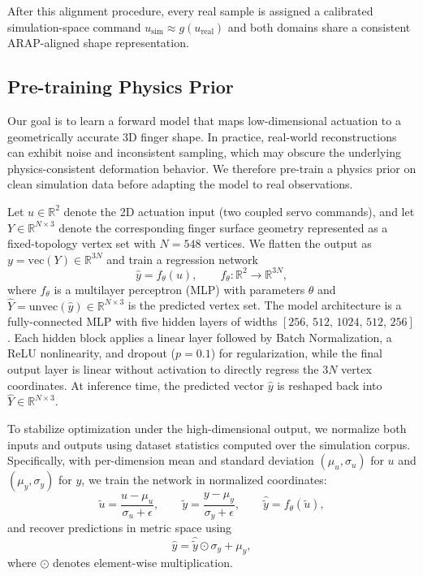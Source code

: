 \documentclass[letterpaper, 10 pt, conference]{ieeeconf}  %
\begin{document}
After this alignment procedure, every real sample is assigned a calibrated simulation-space command $u_{\text{sim}} \approx g(u_{\text{real}})$ and both domains share a consistent ARAP-aligned shape representation.

\subsection{Pre-training Physics Prior}
\label{sec:sim_pretrain}

Our goal is to learn a forward model that maps low-dimensional actuation to a geometrically accurate 3D finger shape. In practice, real-world reconstructions can exhibit noise and inconsistent sampling, which may obscure the underlying physics-consistent deformation behavior. We therefore pre-train a physics prior on clean simulation data before adapting the model to real observations.

Let $u \in \mathbb{R}^2$ denote the 2D actuation input (two coupled servo commands), and let $Y \in \mathbb{R}^{N\times 3}$ denote the corresponding finger surface geometry represented as a fixed-topology vertex set with $N=548$ vertices. We flatten the output as $y=\mathrm{vec}(Y)\in\mathbb{R}^{3N}$ and train a regression network
\begin{equation}
\hat{y} = f_{\theta}(u), \qquad f_{\theta}:\mathbb{R}^{2}\rightarrow\mathbb{R}^{3N},
\label{eq:forward_model}
\end{equation}
where $f_{\theta}$ is a multilayer perceptron (MLP) with parameters $\theta$ and $\hat{Y}=\mathrm{unvec}(\hat{y})\in\mathbb{R}^{N\times 3}$ is the predicted vertex set. The model architecture is a fully-connected MLP with five hidden layers of widths $[256,\,512,\,1024,\,512,\,256]$. Each hidden block applies a linear layer followed by Batch Normalization, a ReLU nonlinearity, and dropout ($p=0.1$) for regularization, while the final output layer is linear without activation to directly regress the $3N$ vertex coordinates. At inference time, the predicted vector $\hat{y}$ is reshaped back into $\hat{Y}\in\mathbb{R}^{N\times 3}$.

To stabilize optimization under the high-dimensional output, we normalize both inputs and outputs using dataset statistics computed over the simulation corpus. Specifically, with per-dimension mean and standard deviation $(\mu_u,\sigma_u)$ for $u$ and $(\mu_y,\sigma_y)$ for $y$, we train the network in normalized coordinates:
\begin{equation}
\tilde{u}=\frac{u-\mu_u}{\sigma_u+\epsilon},\qquad
\tilde{y}=\frac{y-\mu_y}{\sigma_y+\epsilon},\qquad
\hat{\tilde{y}} = f_{\theta}(\tilde{u}),
\label{eq:normalization}
\end{equation}
and recover predictions in metric space using
\begin{equation}
\hat{y} = \hat{\tilde{y}}\odot \sigma_y + \mu_y,
\label{eq:denorm}
\end{equation}
where $\odot$ denotes element-wise multiplication.
\end{document}
